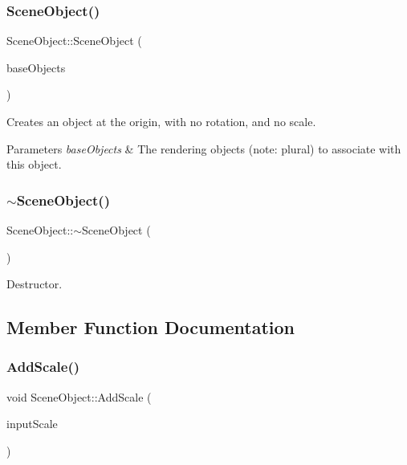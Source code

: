 \subsubsection{\texorpdfstring{Scene\+Object()}{SceneObject()}\hspace{0.1cm}{\footnotesize\ttfamily [3/3]}}
{\footnotesize\ttfamily Scene\+Object\+::\+Scene\+Object (\begin{DoxyParamCaption}\item[{const std\+::vector$<$ std\+::shared\+\_\+ptr$<$ class \hyperlink{class_rendering_object}{Rendering\+Object} $>$$>$ \&}]{base\+Objects }\end{DoxyParamCaption})}



Creates an object at the origin, with no rotation, and no scale. 


\begin{DoxyParams}{Parameters}
{\em base\+Objects} & The rendering objects (note\+: plural) to associate with this object. \\
\hline
\end{DoxyParams}
\hypertarget{class_scene_object_ab258d6b94e982d5ae71ad4d7652381f4}{}\label{class_scene_object_ab258d6b94e982d5ae71ad4d7652381f4} 
\subsubsection{\texorpdfstring{$\sim$\+Scene\+Object()}{~SceneObject()}}
{\footnotesize\ttfamily Scene\+Object\+::$\sim$\+Scene\+Object (\begin{DoxyParamCaption}{ }\end{DoxyParamCaption})\hspace{0.3cm}{\ttfamily [virtual]}}



Destructor. 



\subsection{Member Function Documentation}
\hypertarget{class_scene_object_a40d7194cf79cad6ee3a2fa7c3d8ed95c}{}\label{class_scene_object_a40d7194cf79cad6ee3a2fa7c3d8ed95c} 
\subsubsection{\texorpdfstring{Add\+Scale()}{AddScale()}}
{\footnotesize\ttfamily void Scene\+Object\+::\+Add\+Scale (\begin{DoxyParamCaption}\item[{float}]{input\+Scale }\end{DoxyParamCaption})}



